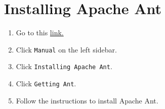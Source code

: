 \documentclass[10pt]{article}
\begin{document}
\section{Installing Apache Ant}

\begin{enumerate}
  \item Go to this \href{http://ant.apache.org/}{link.} 
  \item Click \verb+Manual+ on the left sidebar. 
  \item Click \verb+Installing Apache Ant+.
  \item Click \verb+Getting Ant+.
  \item Follow the instructions to install Apache Ant.
\end{enumerate}
\end{document}
